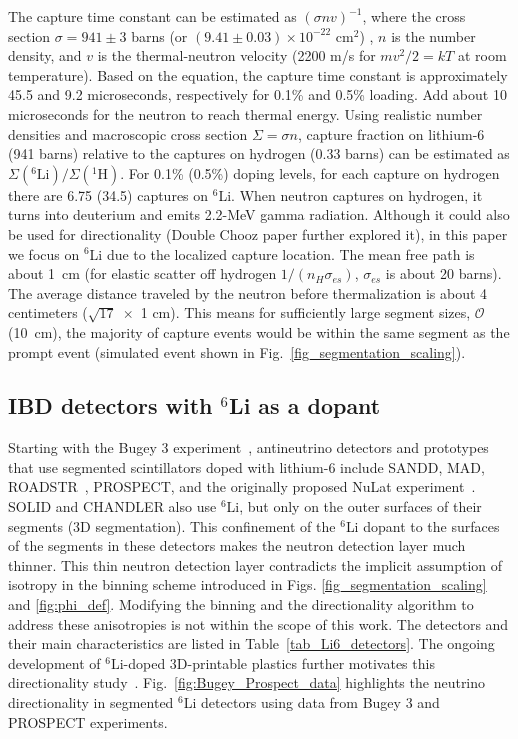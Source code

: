 \documentclass[tightenlines,twocolumn,prl,notitlepage,nofootinbib,preprintnumbers,longbibliography]{revtex4-1}
\begin{document}
The capture time constant can be estimated as $(\sigma n v)^{-1}$, where the cross section $\sigma = 941 \pm 3$ barns  (or $(9.41 \pm 0.03) \times 10^{-22}$ cm$^2$) \cite{osti_6280345}, $n$ is the number density, and $v$ is the thermal-neutron velocity (2200 m/s for $mv^2 /2 = kT$ at room temperature).
Based on the equation, the capture time constant is approximately 45.5 and 9.2 microseconds, respectively for 0.1\% and 0.5\% loading. Add about 10 microseconds for the neutron to reach thermal energy. Using realistic number densities and macroscopic cross section $\Sigma = \sigma n$, capture fraction on lithium-6 (941 barns) relative to the captures on hydrogen (0.33 barns) can be estimated as $\Sigma(^6\mathrm{Li}) / \Sigma (^1\mathrm{H})$. For 0.1\% (0.5\%) doping levels, for each capture on hydrogen there are 6.75 (34.5) captures on $^6$Li. When neutron captures on hydrogen, it turns into deuterium and emits 2.2-MeV gamma radiation. Although it could also be used for directionality (Double Chooz paper further explored it), in this paper we focus on $^6$Li due to the localized capture location.
The mean free path is about 1~cm (for elastic scatter off hydrogen $1/ (n_H \sigma_{es})$, $\sigma_{es}$ is about 20 barns). The average distance traveled by the neutron before thermalization is about 4 centimeters ($\sqrt{17} \; \times$ 1 cm).
This means for sufficiently large segment sizes, $\mathcal{O}$(10~cm), the 
majority of capture events would be within the same segment as the prompt event (simulated event shown in Fig.~\ref{fig_segmentation_scaling}).

\subsection{IBD detectors with ${}^6$Li as a dopant}
Starting with the Bugey 3 experiment~\cite{Bugey3_1995, Bugey3_1996}, antineutrino detectors and prototypes that use segmented scintillators doped with lithium-6 include SANDD, MAD, ROADSTR~\cite{6t97-9bpb}, PROSPECT, and the originally proposed NuLat experiment~\cite{lane2015newtypeneutrinodetector}.
SOLID and CHANDLER also use ${}^6$Li, but only on the outer surfaces of their segments (3D segmentation). This confinement of the ${}^6$Li dopant to the surfaces of the segments in these detectors makes the neutron detection layer much thinner. This thin neutron detection layer contradicts the implicit assumption of isotropy in the binning scheme introduced in Figs. \ref{fig_segmentation_scaling} and \ref{fig:phi_def}. Modifying the binning and the directionality algorithm to address these anisotropies is not within the scope of this work.
The detectors and their main characteristics are listed in Table~\ref{tab_Li6_detectors}. The ongoing development of ${}^6$Li-doped 3D-printable plastics further motivates this directionality study~\cite{KIM2023168537, Barr:2025fxg}.
Fig.~\ref{fig:Bugey_Prospect_data} highlights the neutrino directionality in segmented $^6$Li detectors using data from Bugey 3 and PROSPECT experiments.
\end{document}
